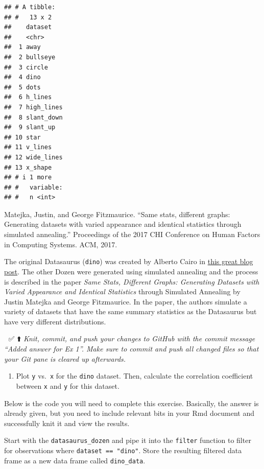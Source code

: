 \documentclass[]{tufte-handout}
\providecommand{\tightlist}{%
  \setlength{\itemsep}{0pt}\setlength{\parskip}{0pt}}
\begin{document}
\begin{verbatim}
## # A tibble:
## #   13 x 2
##    dataset   
##    <chr>     
##  1 away      
##  2 bullseye  
##  3 circle    
##  4 dino      
##  5 dots      
##  6 h_lines   
##  7 high_lines
##  8 slant_down
##  9 slant_up  
## 10 star      
## 11 v_lines   
## 12 wide_lines
## 13 x_shape   
## # i 1 more
## #   variable:
## #   n <int>
\end{verbatim}

\begin{marginfigure}
Matejka, Justin, and George Fitzmaurice. ``Same stats, different graphs:
Generating datasets with varied appearance and identical statistics
through simulated annealing.'' Proceedings of the 2017 CHI Conference on
Human Factors in Computing Systems. ACM, 2017.
\end{marginfigure}

The original Datasaurus (\texttt{dino}) was created by Alberto Cairo in
\href{http://www.thefunctionalart.com/2016/08/download-datasaurus-never-trust-summary.html}{this
great blog post}. The other Dozen were generated using simulated
annealing and the process is described in the paper \emph{Same Stats,
Different Graphs: Generating Datasets with Varied Appearance and
Identical Statistics} through Simulated Annealing by Justin Matejka and
George Fitzmaurice. In the paper, the authors simulate a variety of
datasets that have the same summary statistics as the Datasaurus but
have very different distributions.

🧶 ✅ ⬆️ \emph{Knit, commit, and push your changes to GitHub with the
commit message ``Added answer for Ex 1''. Make sure to commit and push
all changed files so that your Git pane is cleared up afterwards.}

\begin{enumerate}
\def\labelenumi{\arabic{enumi}.}
\setcounter{enumi}{1}
\tightlist
\item
  Plot \texttt{y} vs.~\texttt{x} for the \texttt{dino} dataset. Then,
  calculate the correlation coefficient between \texttt{x} and
  \texttt{y} for this dataset.
\end{enumerate}

Below is the code you will need to complete this exercise. Basically,
the answer is already given, but you need to include relevant bits in
your Rmd document and successfully knit it and view the results.

Start with the \texttt{datasaurus\_dozen} and pipe it into the
\texttt{filter} function to filter for observations where
\texttt{dataset\ ==\ "dino"}. Store the resulting filtered data frame as
a new data frame called \texttt{dino\_data}.
\end{document}
